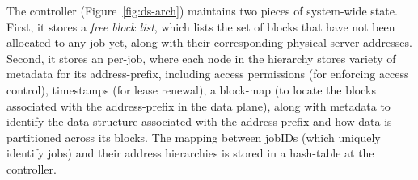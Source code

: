  The \jiffy controller (Figure~\ref{fig:ds-arch}) maintains two pieces of system-wide state. First, it stores a \textit{free block list}, which lists the set of blocks that have not been allocated to any job yet, along with their corresponding physical server addresses. Second, it stores an {\lh} per-job, where each node in the hierarchy stores variety of metadata for its address-prefix, including access permissions (for enforcing access control), timestamps (for lease renewal), a block-map (to locate the blocks associated with the address-prefix in the data plane), along with metadata to identify the data structure associated with the address-prefix and how data is partitioned across its blocks. The mapping between jobIDs (which uniquely identify jobs) and their address hierarchies is stored in a hash-table at the controller.

